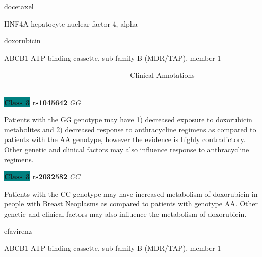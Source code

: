 \documentclass{resume} %
\begin{document}
\begin{rSection}{ docetaxel }
\begin{rSubsection}{ HNF4A }{ hepatocyte nuclear factor 4, alpha }{}{}
\end{rSubsection}

\end{rSection}\begin{rSection}{ doxorubicin }
\item[]

\begin{rSubsection}{ ABCB1 }{ ATP-binding cassette, sub-family B (MDR/TAP), member 1 }{}{}
\item[]

\item[] ---------------------------------------------------- Clinical Annotations -----------------------------------------------------\newline
\item \textbf{\colorbox{teal} {Class 3}} \textbf{ rs1045642 } \textit{ GG }
\item[] Patients with the GG genotype may have 1) decreased exposure to doxorubicin metabolites and 2) decreased response to anthracycline regimens as compared to patients with the AA genotype, however the evidence is highly contradictory. Other genetic and clinical factors may also influence response to anthracycline regimens.\item \textbf{\colorbox{teal} {Class 3}} \textbf{ rs2032582 } \textit{ CC }
\item[] Patients with the  CC genotype may have increased metabolism of doxorubicin in people with Breast Neoplasms as compared to patients with genotype AA. Other genetic and clinical factors may also influence the metabolism of doxorubicin.
\end{rSubsection}

\end{rSection}\begin{rSection}{ efavirenz }
\item[]

\begin{rSubsection}{ ABCB1 }{ ATP-binding cassette, sub-family B (MDR/TAP), member 1 }{}{}
\item[]


\end{rSubsection}
\end{rSection}
\end{document}
